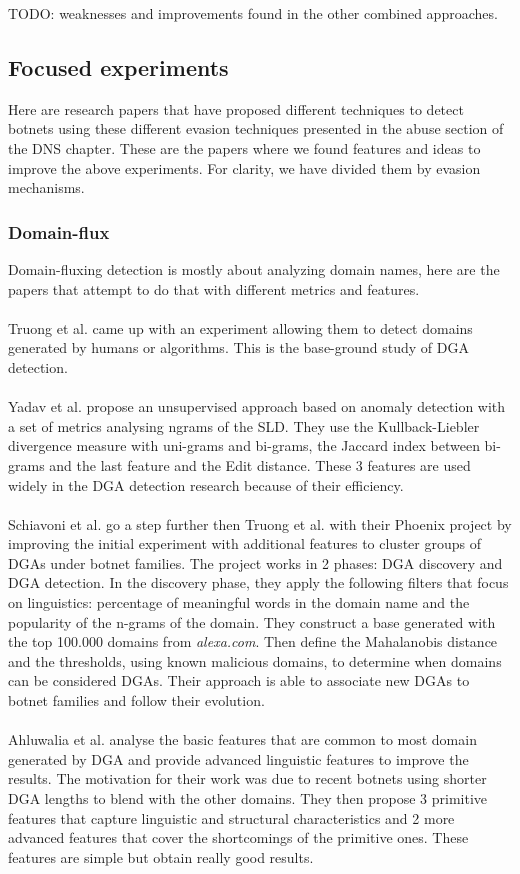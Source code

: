 TODO: weaknesses and improvements found in the other combined approaches.
\subsection{Focused experiments}
Here are research papers that have proposed different techniques to detect botnets using these different evasion techniques presented in the abuse section of the DNS chapter. These are the papers where we found features and ideas to improve the above experiments. For clarity, we have divided them by evasion mechanisms.
\subsubsection{Domain-flux}
Domain-fluxing detection is mostly about analyzing domain names, here are the papers that attempt to do that with different metrics and features.\\
\\
Truong et al. \cite{dns-traffic} came up with an experiment allowing them to detect domains generated by humans or algorithms. This is the base-ground study of DGA detection.\\
\\
Yadav et al. \cite{dga2} propose an unsupervised approach based on anomaly detection with a set of metrics analysing ngrams of the SLD. They use the Kullback-Liebler divergence measure with uni-grams and bi-grams, the Jaccard index between bi-grams and the last feature and the Edit distance. These 3 features are used widely in the DGA detection research because of their efficiency.\\
\\
Schiavoni et al. \cite{phoenix} go a step further then Truong et al. with their Phoenix project by improving the initial experiment with additional features to cluster groups of DGAs under botnet families. The project works in 2 phases: DGA discovery and DGA detection. In the discovery phase, they apply the following filters that focus on linguistics: percentage of meaningful words in the domain name and the popularity of the n-grams of the domain. They construct a base generated with the top 100.000 domains from \textit{alexa.com}. Then define the Mahalanobis distance and the thresholds, using known malicious domains,  to determine when domains can be considered DGAs. Their approach is able to associate new DGAs to botnet families and follow their evolution.\\
\\
Ahluwalia et al. \cite{dga} analyse the basic features that are common to most domain generated by DGA and provide advanced linguistic features to improve the results. The motivation for their work was due to recent botnets using shorter DGA lengths to blend with the other domains. They then propose 3 primitive features that capture linguistic and structural characteristics and 2 more advanced features that cover the shortcomings of the primitive ones. These features are simple but obtain really good results.\\
